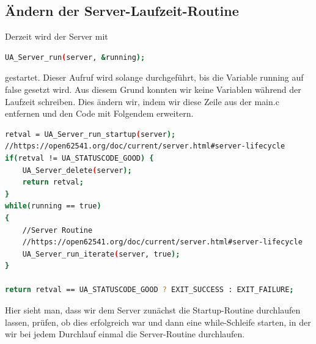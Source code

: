 \subsection{Ändern der Server-Laufzeit-Routine}
Derzeit wird der Server mit
\begin{lstlisting}[language=Bash]
UA_Server_run(server, &running);
\end{lstlisting}
gestartet. Dieser Aufruf wird solange durchgeführt, bis die Variable running auf false gesetzt wird. Aus diesem Grund konnten wir keine Variablen während der Laufzeit schreiben. 
Dies ändern wir, indem wir diese Zeile aus der main.c entfernen und den Code mit Folgendem erweitern.
\begin{lstlisting}[language=Bash]
retval = UA_Server_run_startup(server);
//https://open62541.org/doc/current/server.html#server-lifecycle
if(retval != UA_STATUSCODE_GOOD) {
	UA_Server_delete(server);
	return retval;
}
while(running == true)
{
	//Server Routine
	//https://open62541.org/doc/current/server.html#server-lifecycle
	UA_Server_run_iterate(server, true);
}

return retval == UA_STATUSCODE_GOOD ? EXIT_SUCCESS : EXIT_FAILURE;
\end{lstlisting}
Hier sieht man, dass wir dem Server zunächst die Startup-Routine durchlaufen lassen, prüfen, ob dies erfolgreich war und dann eine while-Schleife starten, in der wir bei jedem Durchlauf einmal die Server-Routine durchlaufen.

